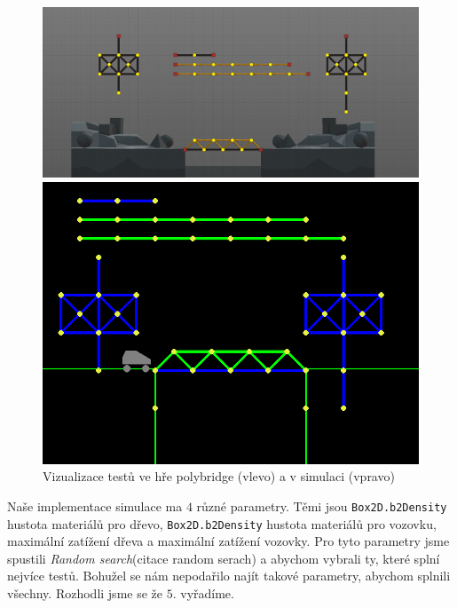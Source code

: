 \begin{figure}[ht]
    \centering
    \begin{minipage}{0.49\textwidth}
        \centering
        \includegraphics[width=\linewidth]{img/poly_tests.png}
    \end{minipage}\hfill
    \begin{minipage}{0.49\textwidth}
        \centering
        \includegraphics[width=\linewidth]{img/sim_tests.png}
    \end{minipage}
    \caption{Vizualizace testů ve hře polybridge (vlevo) a v simulaci (vpravo)}
    \label{impl-fig:1}
\end{figure}

Naše implementace simulace ma $4$ různé parametry. Těmi jsou \texttt{Box2D.b2Density} hustota materiálů pro dřevo, \texttt{Box2D.b2Density} hustota materiálů pro vozovku, maximální zatížení dřeva a maximální zatížení vozovky. Pro tyto parametry jsme spustili \textit{Random search}(citace random serach) a abychom vybrali ty, které splní nejvíce testů. Bohužel se nám nepodařilo najít takové parametry, abychom splnili všechny. Rozhodli jsme se že $5.$ vyřadíme.

